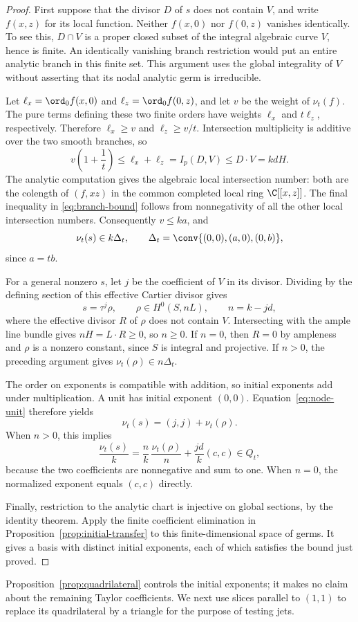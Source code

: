 \begin{proof}
First suppose that the divisor $D$ of $s$ does not contain $V$, and write
$f(x,z)$ for its local function.  Neither $f(x,0)$ nor $f(0,z)$ vanishes
identically.  To see this, $D\cap V$ is a proper closed subset of the
integral algebraic curve $V$, hence is finite.  An identically vanishing
branch restriction would put an entire analytic branch in this finite
set.  This argument uses the global integrality of $V$ without asserting
that its nodal analytic germ is irreducible.

Let $\ell_x=\ord_0f(x,0)$ and $\ell_z=\ord_0f(0,z)$, and let $v$ be
the weight of $\nu_t(f)$.  The pure terms defining these two finite
orders have weights $\ell_x$ and $t\ell_z$, respectively.  Therefore
$\ell_x\ge v$ and $\ell_z\ge v/t$.  Intersection multiplicity is additive
over the two smooth branches, so
\begin{equation}
 v\left(1+\frac1t\right)
 \le \ell_x+\ell_z
 = I_p(D,V)
 \le D\cdot V=kdH.
 \label{eq:branch-bound}
\end{equation}
The analytic computation gives the algebraic local intersection number:
both are the colength of $(f,xz)$ in the common completed local ring
$\C[[x,z]]$.  The final inequality in \eqref{eq:branch-bound} follows
from nonnegativity of all the other local intersection numbers.
Consequently $v\le ka$, and
\begin{equation}
 \nu_t(s)\in k\Delta_t,\qquad
 \Delta_t=\conv\{(0,0),(a,0),(0,b)\},
 \label{eq:residual-triangle}
\end{equation}
since $a=tb$.

For a general nonzero $s$, let $j$ be the coefficient of $V$ in its
divisor.  Dividing by the defining section of this effective Cartier
divisor gives
\[
 s=\tau^j\rho,\qquad
 \rho\in H^0(S,nL),\qquad n=k-jd,
\]
where the effective divisor $R$ of $\rho$ does not contain $V$.
Intersecting with the ample line bundle gives
$nH=L\cdot R\ge0$, so $n\ge0$.  If $n=0$, then $R=0$ by ampleness
and $\rho$ is a nonzero constant, since $S$ is integral and projective.
If $n>0$, the preceding argument gives $\nu_t(\rho)\in n\Delta_t$.

The order on exponents is compatible with addition, so initial exponents
add under multiplication.  A unit has initial exponent $(0,0)$.
Equation~\eqref{eq:node-unit} therefore yields
\[
 \nu_t(s)=(j,j)+\nu_t(\rho).
\]
When $n>0$, this implies
\[
 \frac{\nu_t(s)}{k}
 =\frac{n}{k}\,\frac{\nu_t(\rho)}{n}
  +\frac{jd}{k}(c,c)\in Q_t,
\]
because the two coefficients are nonnegative and sum to one.  When
$n=0$, the normalized exponent equals $(c,c)$ directly.

Finally, restriction to the analytic chart is injective on global
sections, by the identity theorem.  Apply the finite coefficient
elimination in Proposition~\ref{prop:initial-transfer} to this
finite-dimensional space of germs.  It gives a basis with distinct
initial exponents, each of which satisfies the bound just proved.
\end{proof}

Proposition~\ref{prop:quadrilateral} controls the initial exponents; it
makes no claim about the remaining Taylor coefficients.  We next use
slices parallel to $(1,1)$ to replace its quadrilateral by a triangle
for the purpose of testing jets.
